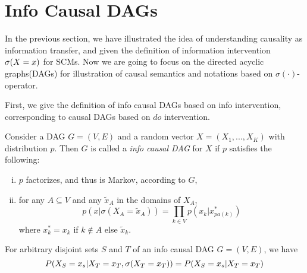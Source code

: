 

\section{Info Causal DAGs}

In the previous section, we have illustrated the idea of understanding causality as information transfer, and given the definition of information intervention $\mathrm{\sigma}(X =x)$ for SCMs. Now we are going to focus on the directed acyclic graphs(DAGs) for illustration of causal semantics and notations based on $\sigma(\cdot)$-operator.

First, we give the definition of info causal DAGs based on info intervention, corresponding to causal DAGs based on $do$ intervention.

\begin{Def}
	Consider a DAG $G = (V, E)$ and a random vector $X = (X_1, ..., X_K)$ with distribution $p$. Then $G$ is called a \emph{info causal DAG} for $X$ if $p$ satisfies the following:
	\begin{enumerate}[(i)]
		\setlength{\itemsep}{0pt}
		\item $p$ factorizes, and thus is Markov, according to $G$,  
		\item for any $A \subseteq V$ and any $\tilde{x}_A$ in the domains of $X_A$,
		\begin{equation}\label{eq:sigma}
			p(x| \sigma(X_A =\tilde{x}_A)) = \prod_{k \in V} p(x_k|x_{pa(k)}^*)
		\end{equation}		
		where $x^*_k = x_k$ if $k \notin A$ else $\tilde{x}_k$.
	\end{enumerate}
\end{Def}



\begin{Lem}
	\label{Lem:consistent}
	For arbitrary disjoint sets  $S$ and $T$ of an info causal DAG $G = (V, E)$,  we have 
	$$
	P(X_S=x_s|X_T=x_T, \mathrm{\sigma}(X_T=x_T)) = P(X_S=x_s|X_T=x_T)
	$$
\end{Lem}

